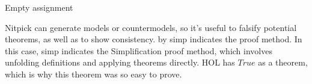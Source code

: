 \begin{isabellebody}
{  Empty assignment \color{black}%
}%
\endisatagproof
{\isafoldproof}%
%
\isadelimproof
%
\endisadelimproof
%
\begin{isamarkuptext}%
{\color{red} Nitpick} \cite{nitpick} can generate models or countermodels, so it's useful to falsify potential
theorems, as well as to show consistency. {\color{red} by simp} indicates the proof method. In this 
case, {\color{red} simp} indicates the Simplification proof method, which involves unfolding definitions
and applying theorems directly. HOL has $True$ as a theorem, which is why this theorem was so easy to prove.%
\end{isamarkuptext}\isamarkuptrue%
%
\isadelimtheory
%
\endisadelimtheory
%
\isatagtheory
%
\endisatagtheory
{\isafoldtheory}%
%
\isadelimtheory
%
\endisadelimtheory
%
\end{isabellebody}%
\endinput
